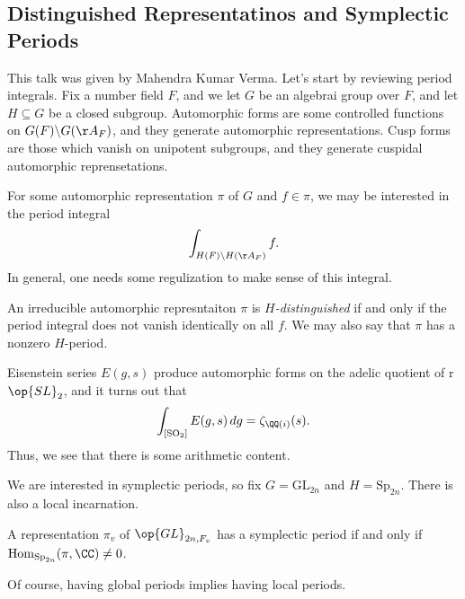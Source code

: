 \documentclass{article}
\begin{document}
\subsection{Distinguished Representatinos and Symplectic Periods}
This talk was given by Mahendra Kumar Verma. Let's start by reviewing period integrals. Fix a number field $F$, and we let $G$ be an algebrai group over $F$, and let $H\subseteq G$ be a closed subgroup. Automorphic forms are some controlled functions on $G(F)\backslash G(\AA_F)$, and they generate automorphic representations. Cusp forms are those which vanish on unipotent subgroups, and they generate cuspidal automorphic reprensetations.

For some automorphic representation $\pi$ of $G$ and $f\in\pi$, we may be interested in the period integral
\[\int_{H(F)\backslash H(\AA_F)}f.\]
In general, one needs some regulization to make sense of this integral.
\begin{definition}
	An irreducible automorphic represntaiton $\pi$ is \textit{$H$-distinguished} if and only if the period integral does not vanish identically on all $f$. We may also say that $\pi$ has a nonzero $H$-period.
\end{definition}
\begin{example}
	Eisenstein series $E(g,s)$ produce automorphic forms on the adelic quotient of r$\op{SL}_2$, and it turns out that
	\[\int_{[\mathrm{SO}_2]}E(g,s)\,dg=\zeta_{\QQ(i)}(s).\]
	Thus, we see that there is some arithmetic content.
\end{example}
We are interested in symplectic periods, so fix $G=\mathrm{GL}_{2n}$ and $H=\mathrm{Sp}_{2n}$. There is also a local incarnation.
\begin{definition}
	A representation $\pi_v$ of $\op{GL}_{2n,F_v}$ has a symplectic period if and only if $\mathrm{Hom}_{\mathrm{Sp}_{2n}}(\pi,\CC)\ne0$.
\end{definition}
Of course, having global periods implies having local periods.
\end{document}
